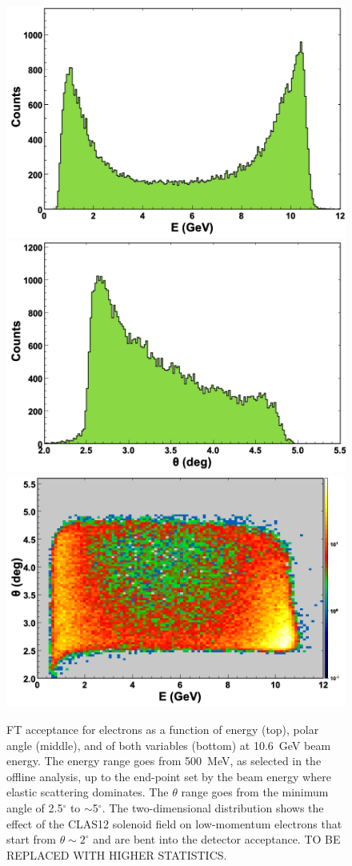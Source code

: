 \begin{figure}[ht]
\begin{center}
\includegraphics[height=0.5\columnwidth]{fig/ft_acceptance_energy.png}
\includegraphics[height=0.5\columnwidth]{fig/ft_acceptance_theta.png}
\includegraphics[height=0.5\columnwidth]{fig/ft_acceptance_energytheta.png}
\end{center}
\caption{FT acceptance for electrons as a function of energy (top), polar angle (middle), and of both
  variables (bottom) at 10.6~GeV beam energy. The energy range goes from 500~MeV, as selected in the offline
  analysis, up to the end-point set by the beam energy where elastic scattering dominates. The $\theta$ range goes
  from the minimum angle of 2.5$^\circ$ to $\sim$5$^\circ$. The two-dimensional distribution shows the effect of the
  CLAS12 solenoid field on low-momentum electrons that start from $\theta\sim2^\circ$ and are bent into the
  detector acceptance. TO BE REPLACED WITH HIGHER STATISTICS.}
\label{fig:ft_acceptance}
\end{figure}

